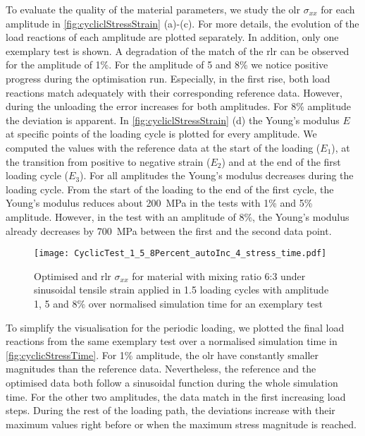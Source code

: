 To evaluate the quality of the material parameters, we study the \acrlong{olr} $\sigma_{xx}$ for each amplitude in \autoref{fig:cycliclStressStrain} (a)-(c). For more details, the evolution of the load reactions of each amplitude are plotted separately. In addition, only one exemplary test is shown. A degradation of the match of the \acrlong{rlr} can be observed for the amplitude of 1\%.
For the amplitude of 5 and 8\% we notice positive progress during the optimisation run. Especially, in the first rise, both load reactions match adequately with their corresponding reference data. However, during the unloading the error increases for both amplitudes. For 8\% amplitude the deviation is apparent. In \autoref{fig:cycliclStressStrain} (d) the Young's modulus $E$ at specific points of the loading cycle is plotted for every amplitude. We computed the values with the reference data at the start of the loading ($E_1$), at the transition from positive to negative strain ($E_2$) and at the end of the first loading cycle ($E_3$). For all amplitudes the Young's modulus decreases during the loading cycle. From the start of the loading to the end of the first cycle, the Young's modulus reduces about 200 MPa in the tests with 1\% and 5\% amplitude. However, in the test with an amplitude of 8\%, the Young's modulus already decreases by 700 MPa between the first and the second data point. 


\begin{figure}[H]
    \centering
    \texttt{[image: CyclicTest\_1\_5\_8Percent\_autoInc\_4\_stress\_time.pdf]}
    \caption{Optimised and \acrfull{rlr} $\sigma_{xx}$ for material with mixing ratio 6:3 under sinusoidal tensile strain applied in 1.5 loading cycles with amplitude 1, 5 and 8\% over normalised simulation time for an exemplary test}
    \label{fig:cyclicStressTime}
\end{figure}

To simplify the visualisation for the periodic loading, we plotted the final load reactions from the same exemplary test over a normalised simulation time in \autoref{fig:cyclicStressTime}. For 1\% amplitude, the \acrlong{olr} have constantly smaller magnitudes than the reference data.
Nevertheless, the reference and the optimised data both follow a sinusoidal function during the whole simulation time.  For the other two amplitudes, the data match in the first increasing load steps. During the rest of the loading path, the deviations increase with their maximum values right before or when the maximum stress magnitude is reached. 

